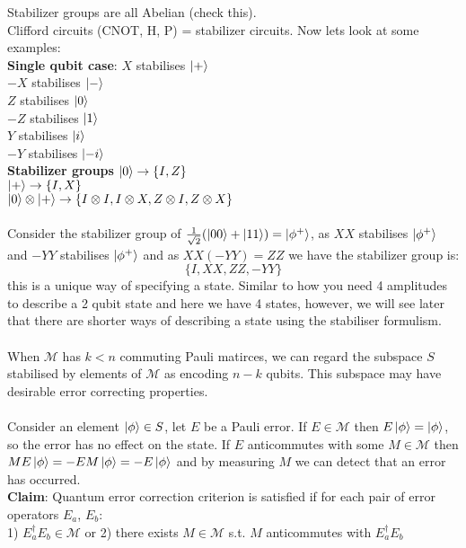 \documentclass{article}
\begin{document}
Stabilizer groups are all Abelian (check this).\\
Clifford circuits (CNOT, H, P) = stabilizer circuits. Now lets look at some examples:\\
\textbf{Single qubit case}:
$X$ stabilises $\ket{+}$\\
$-X$ stabilises $\ket{-}$\\
$Z$ stabilises $\ket{0}$\\
$-Z$ stabilises $\ket{1}$\\
$Y$ stabilises $\ket{i}$\\
$-Y$ stabilises $\ket{-i}$\\
\textbf{Stabilizer groups}
$\ket{0} \rightarrow \{I, Z\}$\\
$\ket{+} \rightarrow \{I, X\}$\\
$\ket{0} \otimes \ket{+} \rightarrow \{ I \otimes I, I \otimes X, Z \otimes I, Z \otimes X\}$\\\\
Consider the stabilizer group of $\frac{1}{\sqrt{2}}( \ket{00} + \ket{11}) = \ket{\phi^+}$, as $XX$ stabilises $\ket{\phi^+}$ and $-YY$ stabilises $\ket{\phi^+}$ and as $XX(-YY) = ZZ$ we have the stabilizer group is:
$$
 \{ I, XX, ZZ, -YY\}
$$
this is a unique way of specifying a state. Similar to how you need 4 amplitudes to describe a 2 qubit state and here we have 4 states, however, we will see later that there are shorter ways of describing a state using the stabiliser formulism.\\\\
When $\mathcal{M}$ has $k< n$ commuting Pauli matirces, we can regard the subspace $S$ stabilised by elements of $\mathcal{M}$ as encoding $n-k$ qubits. This subspace may have desirable error correcting properties.\\\\
Consider an element $\ket{\phi} \in S$, let $E$ be a Pauli error. If $E \in \mathcal{M}$ then $E \ket{\phi} = \ket{\phi}$, so the error has no effect on the state. If $E$ anticommutes with some $M \in \mathcal{M}$ then $ME \ket{\phi} = - EM \ket{\phi} = - E \ket{\phi}$ and by measuring $M$ we can detect that an error has occurred.\\
\textbf{Claim}: Quantum error correction criterion is satisfied if for each pair of error operators $E_a$, $E_b$:\\
1) $E_a^{\dagger} E_b \in \mathcal{M}$ or 2) there exists $M \in \mathcal{M}$ s.t. $M$ anticommutes with $E_a^{\dagger} E_b$\\\\
\end{document}
